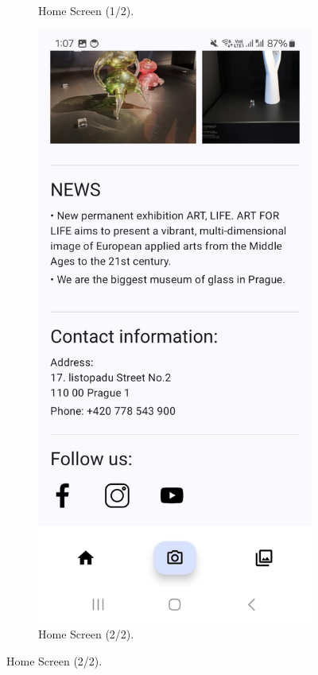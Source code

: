 \begin{figure}[h]
\begin{subfigure}[b]{0.3\textwidth}
        \caption{Home Screen (1/2).}
    \end{subfigure}
    \hfill
    \begin{subfigure}[b]{0.3\textwidth}
        \centering
        \includegraphics[width=\textwidth]{img/home-screen-2.jpg}
        \caption{Home Screen (2/2).}
    \end{subfigure}


\end{figure}
